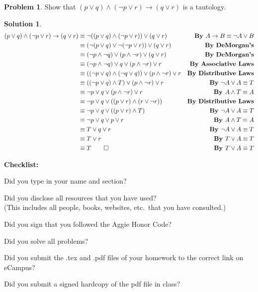 \documentclass{article}
\theoremstyle{definition}
\newtheorem{problem}{Problem}
\newtheorem*{solution}{Solution}
\newcommand{\checklist}{\noindent\textbf{Checklist:}
\begin{compactitem}[$\Box$] 
\item Did you type in your name and section? 
\item Did you disclose all resources that you have used? \\
(This includes all people, books, websites, etc.\ that you have consulted.)
\item Did you sign that you followed the Aggie Honor Code? 
\item Did you solve all problems? 
\item Did you submit the .tex and .pdf files of your homework to the correct link on eCampus?
\item Did you submit a signed hardcopy of the pdf file in class? 
\end{compactitem}
}
\begin{document}
\begin{problem} Show that $(p\lor q)\land (\neg p\lor r)\rightarrow (q\lor r)$
is a tautology.
\end{problem}
\begin{solution}
  \begin{align*}
    (p\lor q)\land (\neg p\lor r)\rightarrow (q\lor r) &\equiv
    \neg((p\lor q)\land (\neg p\lor r))\lor (q\lor r) &
    \textbf{By $A \rightarrow B \equiv \neg A \lor B$} \\
    &\equiv (\neg(p \lor q) \lor \neg(\neg p \lor r)) \lor (q\lor r) & \textbf{By DeMorgan's} \\
    &\equiv (\neg p \land \neg q) \lor (p \land \neg r) \lor (q \lor r) & \textbf{By DeMorgan's} \\
    &\equiv (\neg p \land \neg q) \lor q \lor (p \land \neg r) \lor r & \textbf{By Associative Laws} \\
    & \equiv ((\neg p \lor q) \land (\neg q \lor q)) \lor (p \land \neg r) \lor r & \textbf{By Distributive Laws} \\
    & \equiv ((\neg p \lor q) \land T) \lor (p \land \neg r) \lor r & \textbf{By $\neg A \lor A \equiv T$} \\
    & \equiv \neg p \lor q \lor (p \land \neg r) \lor r & \textbf{By $A \land T \equiv A$} \\
    & \equiv \neg p \lor q \lor ((p \lor r) \land ( r \lor \neg r)) & \textbf{By Distributive Laws} \\
    & \equiv \neg p \lor q \lor ((p \lor r) \land T) & \textbf{By $\neg A \lor A \equiv T$} \\
    & \equiv \neg p \lor q \lor p \lor r & \textbf{By $A \land T \equiv A$} \\
    &\equiv T \lor q \lor r & \textbf{By $\neg A \lor A \equiv T$} \\
    &\equiv T \lor r & \textbf{By $T \lor A \equiv T$} \\
    &\equiv T \qed & \textbf{By $T \lor A \equiv T$}
  \end{align*}
\end{solution}

\goodbreak
\checklist
\end{document}
